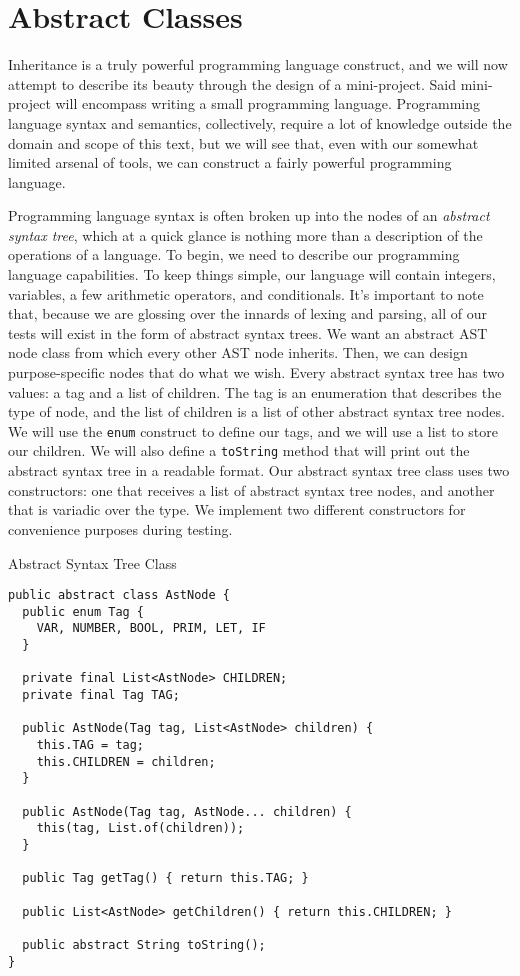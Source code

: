 \section{Abstract Classes}

\example Inheritance is a truly powerful programming language construct, and we will now attempt to describe its beauty through the design of a mini-project. Said mini-project will encompass writing a small programming language. Programming language syntax and semantics, collectively, require a lot of knowledge outside the domain and scope of this text, but we will see that, even with our somewhat limited arsenal of tools, we can construct a fairly powerful programming language.

Programming language syntax is often broken up into the nodes of an \textit{abstract syntax tree}, which at a quick glance is nothing more than a description of the operations of a language. To begin, we need to describe our programming language capabilities. To keep things simple, our language will contain integers, variables, a few arithmetic operators, and conditionals. It’s important to note that, because we are glossing over the innards of lexing and  parsing, all of our tests will exist in the form of abstract syntax trees. We want an abstract AST node class from which every other AST node inherits. Then, we can design purpose-specific nodes that do what we wish. Every abstract syntax tree has two values: a tag and a list of children. The tag is an enumeration that describes the type of node, and the list of children is a list of other abstract syntax tree nodes. We will use the \texttt{enum} construct to define our tags, and we will use a list to store our children. We will also define a \texttt{toString} method that will print out the abstract syntax tree in a readable format. Our abstract syntax tree class uses two constructors: one that receives a list of abstract syntax tree nodes, and another that is variadic over the  type. We implement two different constructors for convenience purposes during testing.

\begin{cl}{Abstract Syntax Tree Class}
\begin{lstlisting}[language=MyJava]
public abstract class AstNode {
  public enum Tag {
    VAR, NUMBER, BOOL, PRIM, LET, IF
  }

  private final List<AstNode> CHILDREN;  
  private final Tag TAG;
 
  public AstNode(Tag tag, List<AstNode> children) {
    this.TAG = tag;
    this.CHILDREN = children;
  }

  public AstNode(Tag tag, AstNode... children) {
    this(tag, List.of(children));
  }

  public Tag getTag() { return this.TAG; }

  public List<AstNode> getChildren() { return this.CHILDREN; }

  public abstract String toString();
}
\end{lstlisting}
\end{cl}

